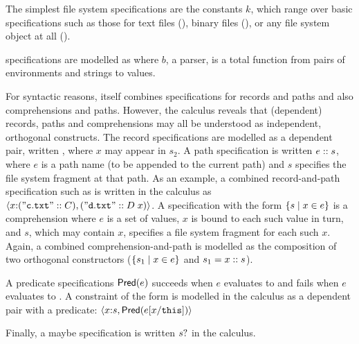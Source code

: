 \documentclass[nocopyrightspace,natbib]{sigplanconf}
\begin{document}
The simplest file system specifications are the constants
$k$, which range over basic specifications such as those for
text files (\ptext), binary files (\pbin), or any
file system object at all (\pany). 

\padshaskell{} specifications are modelled as
 where $b$, a parser,  is a total
function from pairs of environments and strings to
values.  

For syntactic reasons, \forest{} itself combines specifications
for records and paths and also comprehensions and paths.
However, the calculus reveals that (dependent) records, paths 
and comprehensions
may all be understood as independent, orthogonal constructs.
The record specifications are modelled as a dependent pair,
written , where $x$ may appear in $s_2$.
A path specification is written $e \mathrel{::} s$, where $e$ is
a path name (to be appended to the current path) and 
$s$ specifies the file system fragment at that path.  As an example,
a combined \forest{} record-and-path specification such as
is written in the calculus as
$\langle x {:} (\mathtt{"c.txt"} \mathrel{::} C), (\mathtt{"d.txt"} \mathrel{::} D\; x) \rangle$.
A specification with the form $\{ s \mid x \in e \}$ is a comprehension where
$e$ is a set of values, $x$ is bound to each such value in turn, and
$s$, which may contain $x$, specifies a file system fragment for each
such $x$.  Again, a combined \forest{} comprehension-and-path
\cd{[x :: s | x <- e]} is modelled as the composition of two
orthogonal constructors ($\{ s_1 \mid x \in e \}$ and $s_1 = x \mathrel{::} s$).

A predicate specifications $\mathsf{Pred}(e)$ succeeds
when $e$ evaluates to \True{} and fails when $e$ evaluates
to \False.  A \forest{} constraint of the form 
is modelled in the calculus as a dependent pair with a predicate:
$\langle x {:} s, \mathsf{Pred}(e[x/\mathtt{this}]) \rangle$

Finally, a maybe specification is written $s?$ in the calculus.
 
\end{document}

